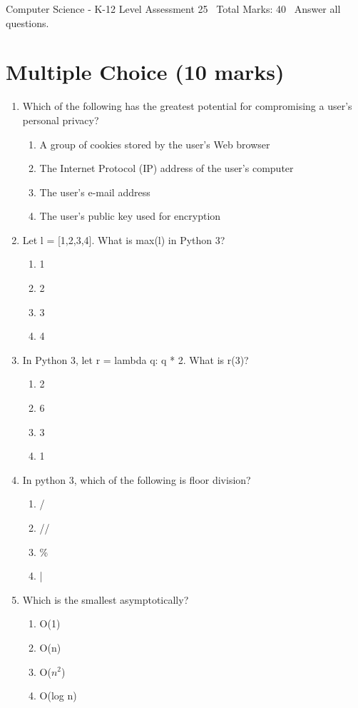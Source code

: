 \documentclass[12pt]{article}
\begin{document}
\begin{center}
Computer Science - K-12 Level Assessment 25 \
Total Marks: 40 \
Answer all questions.
\end{center}

\section*{Multiple Choice (10 marks)}
\begin{enumerate}[label=\arabic*.]
\item Which of the following has the greatest potential for compromising a user's personal privacy?
\begin{enumerate}[label=(\alph*)]
    \item A group of cookies stored by the user's Web browser
    \item The Internet Protocol (IP) address of the user's computer
    \item The user's e-mail address
    \item The user's public key used for encryption
\end{enumerate}
\item Let l = [1,2,3,4]. What is max(l) in Python 3?
\begin{enumerate}[label=(\alph*)]
    \item 1
    \item 2
    \item 3
    \item 4
\end{enumerate}
\item In Python 3, let r = lambda q: q * 2. What is r(3)?
\begin{enumerate}[label=(\alph*)]
    \item 2
    \item 6
    \item 3
    \item 1
\end{enumerate}
\item In python 3, which of the following is floor division?
\begin{enumerate}[label=(\alph*)]
    \item /
    \item //
    \item \%
    \item |
\end{enumerate}
\item Which is the smallest asymptotically?
\begin{enumerate}[label=(\alph*)]
    \item O(1)
    \item O(n)
    \item O($n^2$)
    \item O(log n)
\end{enumerate}
\end{enumerate}
\end{document}
